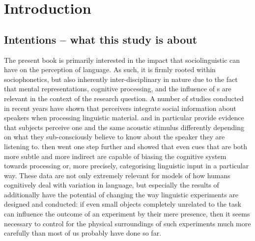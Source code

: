 \chapter{Introduction}
\label{ch.intro}

\section{Intentions -- what this study is about}
\label{sec.intro.intent}

The present book is primarily interested in the impact that sociolinguistic  can have on the perception of language.
As such, it is firmly rooted within sociophonetics, but also inherently inter-disciplinary in nature due to the fact that mental representations, cognitive processing, and the influence of s are relevant in the context of the research question.
A number of studies conducted in recent years have shown that perceivers integrate social information about speakers when processing linguistic material.
\textcite{niedzielski1999} and \textcite{hayetal2006a} in particular provide evidence that subjects perceive one and the same acoustic stimulus differently depending on what they sub-consciously believe to know about the speaker they are listening to.
\textcite{haydrager2010} then went one step further and showed that even cues that are both more subtle and more indirect are capable of biasing the cognitive system towards processing or, more precisely, categorising linguistic input in a particular way.
These data are not only extremely relevant for models of how humans cognitively deal with variation in language, but especially the results of \textcite{haydrager2010} additionally have the potential of changing the way linguistic experiments are designed and conducted: if even small objects completely unrelated to the task can influence the outcome of an experiment by their mere presence, then it seems necessary to control for the physical surroundings of such experiments much more carefully than most of us probably have done so far.

